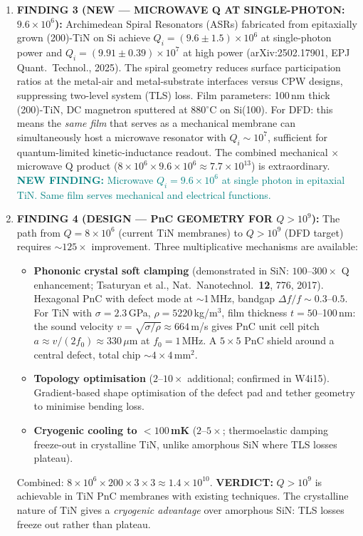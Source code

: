 \documentclass[11pt]{article}
\theoremstyle{remark}
\newcommand{\ee}[1]{\times 10^{#1}}
\newcommand{\verdict}[1]{\textcolor{green!50!black}{\textbf{VERDICT:} #1}}
\newcommand{\newfinding}[1]{\textcolor{teal}{\textbf{NEW FINDING:} #1}}
\begin{document}
\begin{tcolorbox}[colback=blue!5!white, colframe=blue!50!black,
  title=\textbf{W4i17 TOP 5 FINDINGS --- Ranked by Programme Impact}]
\begin{enumerate}
\item \textbf{FINDING 3 (NEW --- MICROWAVE Q AT SINGLE-PHOTON: $9.6\ee{6}$):}
Archimedean Spiral Resonators (ASRs) fabricated from epitaxially grown
(200)-TiN on Si achieve $Q_i = (9.6 \pm 1.5)\ee{6}$ at single-photon
power and $Q_i = (9.91 \pm 0.39)\ee{7}$ at high power
(arXiv:2502.17901, EPJ Quant.\ Technol., 2025). The spiral geometry
reduces surface participation ratios at the metal-air and metal-substrate
interfaces versus CPW designs, suppressing two-level system (TLS) loss.
Film parameters: 100\,nm thick (200)-TiN, DC magnetron sputtered at
880$^\circ$C on Si(100). For DFD: this means the \emph{same film} that
serves as a mechanical membrane can simultaneously host a microwave
resonator with $Q_i \sim 10^7$, sufficient for quantum-limited
kinetic-inductance readout. The combined mechanical $\times$ microwave Q
product ($8\ee{6} \times 9.6\ee{6} \approx 7.7\ee{13}$) is extraordinary.
\newfinding{Microwave $Q_i = 9.6\ee{6}$ at single photon in epitaxial TiN.
Same film serves mechanical and electrical functions.}

\item \textbf{FINDING 4 (DESIGN --- PnC GEOMETRY FOR $Q > 10^9$):}
The path from $Q = 8\ee{6}$ (current TiN membranes) to $Q > 10^9$
(DFD target) requires $\sim 125\times$ improvement. Three multiplicative
mechanisms are available:
\begin{itemize}[nosep]
  \item \textbf{Phononic crystal soft clamping} (demonstrated in SiN:
    $100$--$300\times$ Q enhancement; Tsaturyan et al., Nat.\ Nanotechnol.\
    \textbf{12}, 776, 2017). Hexagonal PnC with defect mode at $\sim$1\,MHz,
    bandgap $\Delta f/f \sim 0.3$--$0.5$. For TiN with $\sigma = 2.3$\,GPa,
    $\rho = 5220$\,kg/m$^3$, film thickness $t = 50$--100\,nm:
    the sound velocity $v = \sqrt{\sigma/\rho} \approx 664$\,m/s gives
    PnC unit cell pitch $a \approx v/(2f_0) \approx 330\,\mu$m at $f_0 = 1$\,MHz.
    A $5\times 5$ PnC shield around a central defect, total chip
    $\sim 4\times 4$\,mm$^2$.
  \item \textbf{Topology optimisation} ($2$--$10\times$ additional;
    confirmed in W4i15). Gradient-based shape optimisation of the defect
    pad and tether geometry to minimise bending loss.
  \item \textbf{Cryogenic cooling to $< 100$\,mK} ($2$--$5\times$;
    thermoelastic damping freeze-out in crystalline TiN, unlike amorphous
    SiN where TLS losses plateau).
\end{itemize}
Combined: $8\ee{6} \times 200 \times 3 \times 3 \approx 1.4\ee{10}$.
\verdict{$Q > 10^9$ is achievable in TiN PnC membranes with existing
techniques. The crystalline nature of TiN gives a \emph{cryogenic advantage}
over amorphous SiN: TLS losses freeze out rather than plateau.}


\end{enumerate}
\end{tcolorbox}
\end{document}
